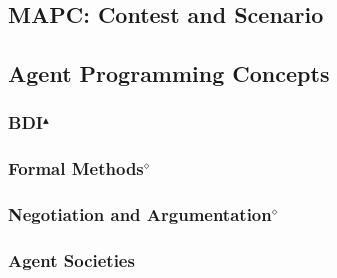\subsection{MAPC: Contest and Scenario}


\subsection{Agent Programming Concepts}

\subsubsection[BDI]{BDI$^\blacktriangle$}


\subsubsection[Formal Methods]{Formal Methods$^\diamond$}


\subsubsection[Negotiation and Argumentation]{Negotiation and Argumentation$^\diamond$}


\subsubsection{Agent Societies}
